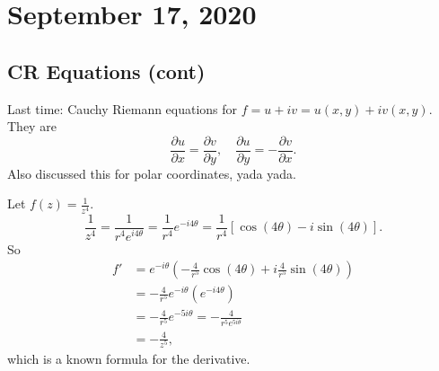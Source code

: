 \section{September 17, 2020}

\subsection{CR Equations (cont)}
Last time: Cauchy Riemann equations for $f=u+iv=u(x,y)+iv(x,y)$. They are \[
\frac{\partial u}{\partial x}=\frac{\partial v}{\partial y},\quad\frac{\partial u}{\partial y}=- \frac{\partial v}{\partial x}.
\] Also discussed this for polar coordinates, yada yada.
\begin{example}
    Let $f(z)=\frac{1}{z^{4}}.$ \[
        \frac{1}{z^{4}}=\frac{1}{r^{4}e^{i4\theta}}=\frac{1}{r^{4}}e^{-i 4\theta}=\frac{1}{r^{4}}[\cos(4\theta)-i \sin(4\theta)].
    \] So 
    \begin{align*}
        f'&=e^{-i\theta}\left( -\frac{4}{r^{5}}\cos(4\theta)+i \frac{4}{r^{5}}\sin(4\theta) \right) \\
          &=- \frac{4}{r^{5}}e^{-i\theta}(e^{-i 4\theta})\\
          &=- \frac{4}{r^{5}}e^{-5i\theta}=- \frac{4}{r^{5}e^{5i\theta}}\\
          &=-\frac{4}{z^{5}},
    \end{align*} which is a known formula for the derivative.
\end{example}

